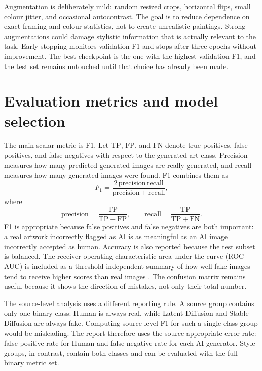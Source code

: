 \documentclass[11pt,a4paper]{article}
\begin{document}
Augmentation is deliberately mild: random resized crops, horizontal flips,
small colour jitter, and occasional autocontrast. The goal is to reduce
dependence on exact framing and colour statistics, not to create unrealistic
paintings. Strong augmentations could damage stylistic information that is
actually relevant to the task. Early stopping monitors validation F1 and stops
after three epochs without improvement. The best checkpoint is the one with
the highest validation F1, and the test set remains untouched until that
choice has already been made.

\section{Evaluation metrics and model selection}

The main scalar metric is F1. Let \(\mathrm{TP}\), \(\mathrm{FP}\), and
\(\mathrm{FN}\) denote true positives, false positives, and false negatives
with respect to the generated-art class. Precision measures how many predicted
generated images are really generated, and recall measures how many generated
images were found. F1 combines them as
\[
  F_1 =
  \frac{2\,\mathrm{precision}\,\mathrm{recall}}
       {\mathrm{precision}+\mathrm{recall}},
\]
where
\[
  \mathrm{precision}=\frac{\mathrm{TP}}{\mathrm{TP}+\mathrm{FP}},
  \qquad
  \mathrm{recall}=\frac{\mathrm{TP}}{\mathrm{TP}+\mathrm{FN}}.
\]
F1 is appropriate because false positives and false negatives are both
important: a real artwork incorrectly flagged as AI is as meaningful as an AI
image incorrectly accepted as human. Accuracy is also reported because the
test subset is balanced. The receiver operating characteristic area under the
curve (ROC-AUC) is included as a threshold-independent summary of how well
fake images tend to receive higher scores than real images \cite{fawcett2006roc}.
The confusion matrix remains useful because it shows the direction of
mistakes, not only their total number.

The source-level analysis uses a different reporting rule. A source group
contains only one binary class: Human is always real, while Latent Diffusion
and Stable Diffusion are always fake. Computing source-level F1 for such a
single-class group would be misleading. The report therefore uses the
source-appropriate error rate: false-positive rate for Human and
false-negative rate for each AI generator. Style groups, in contrast, contain
both classes and can be evaluated with the full binary metric set.
\end{document}
